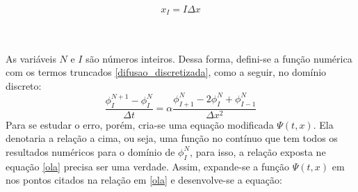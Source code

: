 \documentclass[10pt,twoside,a4paper]{article}
\begin{document}
\begin{minipage}[!h]{0.40\textwidth}
	\begin{equation}
		x_I = I \Delta x
	\end{equation}
\end{minipage}\\
\\
As variáveis $N$ e $I$ são números inteiros. Dessa forma, defini-se a função numérica com os termos truncados \ref{difusao_discretizada}, como a seguir, no domínio discreto:
\begin{equation}\label{ola}
\frac{\phi ^{N + 1} _ I - \phi ^{N} _ I}{\Delta t} 
=
\alpha \frac{\phi ^{N} _ {I + 1} - 2 \phi ^{N} _ I + \phi ^{N} _ {I-1}}{\Delta x ^ 2} 
\end{equation}
Para se estudar o erro, porém, cria-se uma equação modificada $\Psi (t , x) $. Ela denotaria a relação a cima, ou seja, uma função no contínuo que tem todos os resultados numéricos para o domínio de $\phi ^{N} _ {I}$, para isso, a relação exposta ne equação \ref{ola} precisa ser uma verdade. Assim, expande-se a função $ \Psi (t , x)$ em nos pontos citados na relação em \ref{ola} e desenvolve-se a equação:
\end{document}
